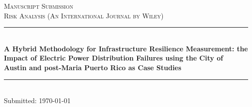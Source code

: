 
\begin{titlepage}

  \newcommand{\HRule}{\rule{\linewidth}{0.5mm}} %

  \center %



  \textsc{\Large Manuscript Submission}\\[0.5cm] %
  \textsc{\large Risk Analysis (An International Journal by Wiley)}\\[0.5cm] %


  \vspace{1.5 cm}
  \HRule \\[0.4cm]
  { \huge \bfseries A Hybrid Methodology for Infrastructure Resilience
    Measurement: the Impact of Electric Power Distribution Failures
    using the City of Austin and post-Maria Puerto Rico as Case
    Studies }\\[0.4cm] %
  \HRule \\[1.5cm]
 
%
%

  \vspace{1.5 cm}
  {\large Submitted: \today}\\[3cm] %


\vfill %

\end{titlepage}


\newpage
